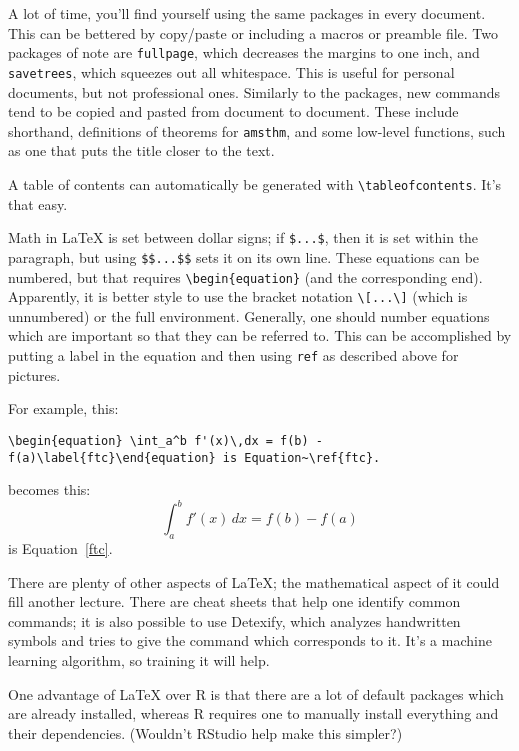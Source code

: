 A lot of time, you'll find yourself using the same packages in every document. This can be bettered by copy/paste or including a macros or preamble file. Two packages of note are \texttt{fullpage}, which decreases the margins to one inch, and \texttt{savetrees}, which squeezes out all whitespace. This is useful for personal documents, but not professional ones. Similarly to the packages, new commands tend to be copied and pasted from document to document. These include shorthand, definitions of theorems for \texttt{amsthm}, and some low-level functions, such as one that puts the title closer to the text.

A table of contents can automatically be generated with \verb+\tableofcontents+. It's that easy.

Math in \LaTeX{} is set between dollar signs; if \verb+$...$+, then it is set within the paragraph, but using \verb+$$...$$+ sets it on its own line. These equations can be numbered, but that requires \verb+\begin{equation}+ (and the corresponding end). Apparently, it is better style to use the bracket notation \verb+\[...\]+ (which is unnumbered) or the full environment. Generally, one should number equations which are important so that they can be referred to. This can be accomplished by putting a label in the equation and then using \texttt{ref} as described above for pictures. 

For example, this:

\verb+\begin{equation} \int_a^b f'(x)\,dx = f(b) -f(a)\label{ftc}\end{equation} is Equation~\ref{ftc}.+

becomes this:
\begin{equation} \int_a^b f'(x)\,dx = f(b) -f(a)\label{ftc}\end{equation} is Equation~\ref{ftc}.
\vspace{5mm}

There are plenty of other aspects of \LaTeX{}; the mathematical aspect of it could fill another lecture. There are cheat sheets that help one identify common commands; it is also possible to use Detexify, which analyzes handwritten symbols and tries to give the command which corresponds to it. It's a machine learning algorithm, so training it will help.

One advantage of \LaTeX{} over R is that there are a lot of default packages which are already installed, whereas R requires one to manually install everything and their dependencies. (Wouldn't RStudio help make this simpler?)
